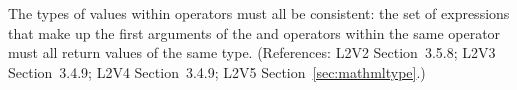 The types of values within  operators must all
be consistent: the set of expressions that make up the first
arguments of the  and  operators
within the same  operator must all return
values of the same type.  (References: L2V2 Section~3.5.8; L2V3 
Section~3.4.9; L2V4 Section~3.4.9; L2V5 Section~\ref{sec:mathmltype}.)
